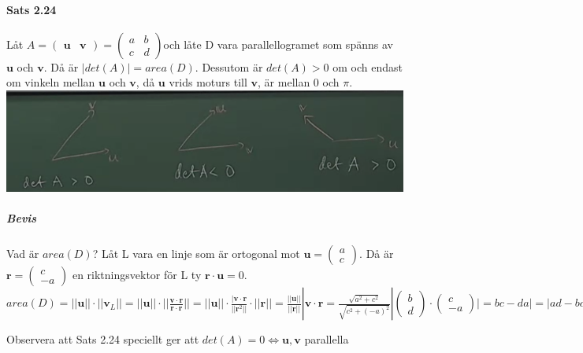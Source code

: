\paragraph{Sats 2.24} Låt $A=\begin{pmatrix}\bm{u}&\bm{v}\end{pmatrix}=\begin{pmatrix}a&b\\c&d\end{pmatrix}$och låte D vara parallellogramet som spänns av $\bm{u}$ och $\bm{v}$.
Då är $|det(A)|=area(D)$.
Dessutom är $det(A)>0$ om och endast om vinkeln mellan $\bm{u}$ och $\bm{v}$, då $\bm{u}$ vrids moturs till $\bm{v}$, är mellan 0 och $\pi$.\\
\includegraphics[scale=0.5]{imgs/22-01-31-img04.png}
\subparagraph{Bevis} Vad är $area(D)$?
Låt L vara en linje som är ortogonal mot $\bm{u}=\begin{pmatrix}
    a\\c
\end{pmatrix}$.
Då är $\bm{r}=\begin{pmatrix}
    c\\-a
\end{pmatrix}$ en riktningsvektor för L ty $\bm{r}\cdot \bm{u}=0$.\\
$area(D)=
||\bm{u}||\cdot ||\bm{v}_{L}||=
||\bm{u}||\cdot ||\frac{\bm{v}\cdot \bm{r}}{\bm{r}\cdot \bm{r}}||
=||\bm{u}||\cdot \frac{|\bm{v}\cdot \bm{r}}{||\bm{r}^{2}||}\cdot ||\bm{r}||=
\frac{||\bm{u}||}{||\bm{r}||}|\bm{v}\cdot\bm{r}=
\frac{\sqrt{a^{2}+c^{2}}}{\sqrt{c^{2}+(-a)^{2}}}|\begin{pmatrix}
    b\\d
\end{pmatrix}\cdot \begin{pmatrix}c\\-a\end{pmatrix}|=
bc-da|=
|ad-bc=
|det(A)|$

Observera att Sats 2.24 speciellt ger att $det(A)=0\Leftrightarrow \bm{u},\bm{v}$ parallella

